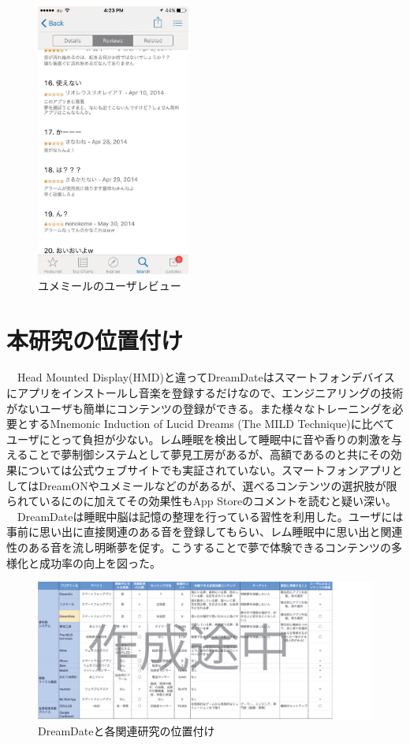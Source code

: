 \begin{figure}[htbp]
 \begin{minipage}{0.45\hsize}
\begin{center}
\includegraphics[height=90mm]{eps/yumemiru.eps}
\caption{ユメミールのユーザレビュー}
\label{DreamOnImage}
\end{center}
\end{minipage}
\end{figure}

\section{本研究の位置付け}
　Head Mounted Display(HMD)と違ってDreamDateはスマートフォンデバイスにアプリをインストールし音楽を登録するだけなので、エンジニアリングの技術がないユーザも簡単にコンテンツの登録ができる。また様々なトレーニングを必要とするMnemonic Induction of Lucid Dreams (The MILD Technique)に比べてユーザにとって負担が少ない。レム睡眠を検出して睡眠中に音や香りの刺激を与えることで夢制御システムとして夢見工房があるが、高額であるのと共にその効果については公式ウェブサイトでも実証されていない。スマートフォンアプリとしてはDreamONやユメミールなどのがあるが、選べるコンテンツの選択肢が限られているにのに加えてその効果性もApp Storeのコメントを読むと疑い深い。\\
　DreamDateは睡眠中脳は記憶の整理を行っている習性を利用した。ユーザには事前に思い出に直接関連のある音を登録してもらい、レム睡眠中に思い出と関連性のある音を流し明晰夢を促す。こうすることで夢で体験できるコンテンツの多様化と成功率の向上を図った。
\begin{figure}[htbp]
\begin{center}
\includegraphics[width=15cm]{eps/mapping.eps}
\caption{DreamDateと各関連研究の位置付け}
\label{takaratomi}
\end{center}
\end{figure}